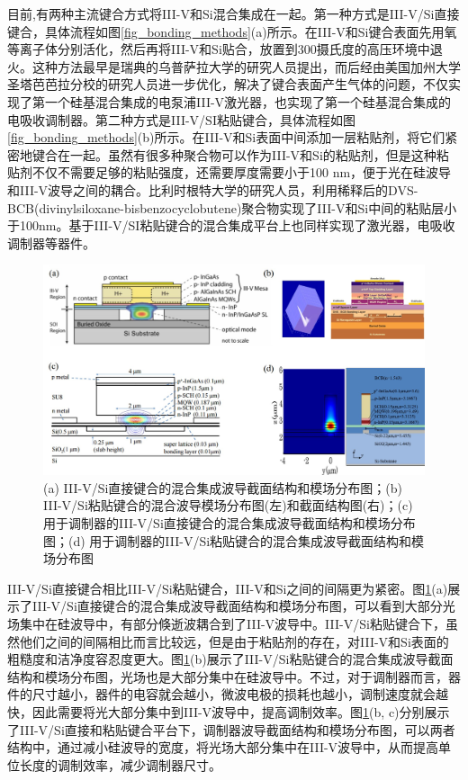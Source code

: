 目前,有两种主流键合方式将III-V和Si混合集成在一起。第一种方式是III-V/Si直接键合，具体流程如图\ref{fig_bonding_methods}(a)所示。在III-V和Si键合表面先用氧等离子体分别活化，然后再将III-V和Si贴合，放置到300摄氏度的高压环境中退火。这种方法最早是瑞典的乌普萨拉大学的研究人员提出\cite{pasquariello2002plasma}，而后经由美国加州大学圣塔芭芭拉分校的研究人员进一步优化\cite{liang2010hybrid}，解决了键合表面产生气体的问题，不仅实现了第一个硅基混合集成的电泵浦III-V激光器\cite{fang2006electrically}，也实现了第一个硅基混合集成的电吸收调制器\cite{kuo2008high}。第二种方式是III-V/SI粘贴键合，具体流程如图\ref{fig_bonding_methods}(b)所示。在III-V和Si表面中间添加一层粘贴剂，将它们紧密地键合在一起。虽然有很多种聚合物可以作为III-V和Si的粘贴剂，但是这种粘贴剂不仅不需要足够的粘贴强度，还需要厚度需要小于100 nm，便于光在硅波导和III-V波导之间的耦合。比利时根特大学的研究人员，利用稀释后的DVS-BCB(divinylsiloxane-bisbenzocyclobutene)聚合物实现了III-V和Si中间的粘贴层小于100nm\cite{liang2010hybrid, roelkens2010iii}。基于III-V/SI粘贴键合的混合集成平台上也同样实现了激光器，电吸收调制器等器件\cite{roelkens2015iii}。

\begin{figure}[htb]
	\centering
	\includegraphics[width=12cm]{./Pictures/fig_hybrid_wg_cross.jpg}
	\caption{ (a) III-V/Si直接键合的混合集成波导截面结构和模场分布图\cite{fang2006electrically}；(b) III-V/Si粘贴键合的混合波导模场分布图(左)和截面结构图(右)\cite{stankovic2010evanescently}；(c) 用于调制器的III-V/Si直接键合的混合集成波导截面结构和模场分布图\cite{tang201150}；(d) 用于调制器的III-V/Si粘贴键合的混合集成波导截面结构和模场分布图}
	\label{fig_hybrid_wg_cross}
\end{figure}

III-V/Si直接键合相比III-V/Si粘贴键合，III-V和Si之间的间隔更为紧密。图\ref{fig_hybrid_wg_cross}(a)展示了III-V/Si直接键合的混合集成波导截面结构和模场分布图，可以看到大部分光场集中在硅波导中，有部分倏逝波耦合到了III-V波导中。III-V/Si粘贴键合下，虽然他们之间的间隔相比而言比较远，但是由于粘贴剂的存在，对III-V和Si表面的粗糙度和洁净度容忍度更大\cite{gunther2007}。图\ref{fig_hybrid_wg_cross}(b)展示了III-V/Si粘贴键合的混合集成波导截面结构和模场分布图，光场也是大部分集中在硅波导中。不过，对于调制器而言，器件的尺寸越小，器件的电容就会越小，微波电极的损耗也越小，调制速度就会越快，因此需要将光大部分集中到III-V波导中，提高调制效率。图\ref{fig_hybrid_wg_cross}(b, c)分别展示了III-V/Si直接和粘贴键合平台下，调制器波导截面结构和模场分布图，可以两者结构中，通过减小硅波导的宽度，将光场大部分集中在III-V波导中，从而提高单位长度的调制效率，减少调制器尺寸。

